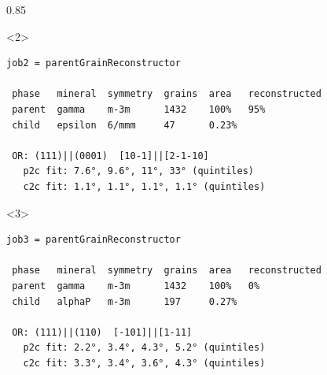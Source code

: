 \documentclass[compress,aspectratio=1610,fleqn,10pt]{beamer}
\begin{document}
\begin{frame}[fragile]
\begin{overlayarea}{\textwidth}{0.85\textheight}


        \begin{onlyenv}<2>
\begin{lstlisting}[style=output]
job2 = parentGrainReconstructor

 phase   mineral  symmetry  grains  area   reconstructed
 parent  gamma    m-3m      1432    100%   95%
 child   epsilon  6/mmm     47      0.23%

 OR: (111)||(0001)  [10-1]||[2-1-10]
   p2c fit: 7.6°, 9.6°, 11°, 33° (quintiles)
   c2c fit: 1.1°, 1.1°, 1.1°, 1.1° (quintiles)
\end{lstlisting}
        \end{onlyenv}

                \begin{onlyenv}<3>
\begin{lstlisting}[style=output]
job3 = parentGrainReconstructor

 phase   mineral  symmetry  grains  area   reconstructed
 parent  gamma    m-3m      1432    100%   0%
 child   alphaP   m-3m      197     0.27%

 OR: (111)||(110)  [-101]||[1-11]
   p2c fit: 2.2°, 3.4°, 4.3°, 5.2° (quintiles)
   c2c fit: 3.3°, 3.4°, 3.6°, 4.3° (quintiles)
\end{lstlisting}
        \end{onlyenv}

  \end{overlayarea}

\end{frame}
\end{document}
